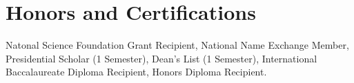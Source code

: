 \documentclass[letterpaper,11pt]{article}
\begin{document}
%
\section{Honors and Certifications}
 \begin{itemize}[leftmargin=0.15in, label={}]
    \small{\item{
     \textbf{}{Natonal Science Foundation Grant Recipient, National Name Exchange Member, Presidential Scholar (1 Semester), Dean’s List (1 Semester), International Baccalaureate Diploma Recipient, Honors Diploma Recipient.} \\
    }}
 \end{itemize}


\end{document}
